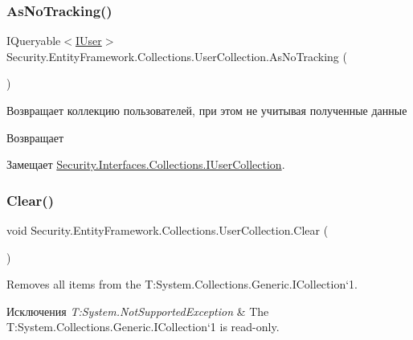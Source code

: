 \subsubsection{\texorpdfstring{As\+No\+Tracking()}{AsNoTracking()}}
{\footnotesize\ttfamily I\+Queryable$<$\hyperlink{interface_security_1_1_interfaces_1_1_model_1_1_i_user}{I\+User}$>$ Security.\+Entity\+Framework.\+Collections.\+User\+Collection.\+As\+No\+Tracking (\begin{DoxyParamCaption}{ }\end{DoxyParamCaption})}



Возвращает коллекцию пользователей, при этом не учитывая полученные данные 

\begin{DoxyReturn}{Возвращает}

\end{DoxyReturn}


Замещает \hyperlink{interface_security_1_1_interfaces_1_1_collections_1_1_i_user_collection_a0c07c3db6d4b0123b4713c3ce436ef61}{Security.\+Interfaces.\+Collections.\+I\+User\+Collection}.

\mbox{\label{class_security_1_1_entity_framework_1_1_collections_1_1_user_collection_a6f99a0cc959603ccb6b43c62b35356e8}} 
\subsubsection{\texorpdfstring{Clear()}{Clear()}}
{\footnotesize\ttfamily void Security.\+Entity\+Framework.\+Collections.\+User\+Collection.\+Clear (\begin{DoxyParamCaption}{ }\end{DoxyParamCaption})}



Removes all items from the T\+:\+System.\+Collections.\+Generic.\+I\+Collection`1. 


\begin{DoxyExceptions}{Исключения}
{\em T\+:\+System.\+Not\+Supported\+Exception} & The T\+:\+System.\+Collections.\+Generic.\+I\+Collection`1 is read-\/only. \\
\hline
\end{DoxyExceptions}
\mbox{\label{class_security_1_1_entity_framework_1_1_collections_1_1_user_collection_a7c69bd803e64d69d528c837e5de7b6af}} 
